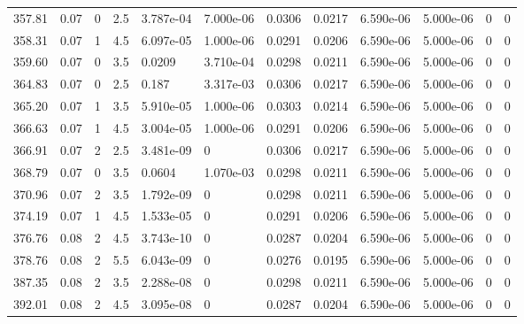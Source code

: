 \documentclass[preview]{standalone}
\begin{document}
{{{{\begin{tabular}{L{1.2cm}C{1.2cm} C{0.3cm}C{0.5cm} C{1.4cm}C{1.4cm} C{1.4cm}C{1.4cm} C{1.6cm}C{1.6cm} C{1.6cm}C{1.6cm}}
  357.81  &  0.07  & 0     & 2.5 &  3.787e-04  & 7.000e-06  &  0.0306&   0.0217& 6.590e-06 & 5.000e-06   &  0 & 0  \\ 
  358.31  &  0.07  & 1     & 4.5 &  6.097e-05  & 1.000e-06  &  0.0291&   0.0206& 6.590e-06 & 5.000e-06   &  0 & 0  \\ 
  359.60  &  0.07  & 0     & 3.5 &  0.0209  & 3.710e-04  &  0.0298&   0.0211& 6.590e-06 & 5.000e-06   &  0 & 0  \\ 
  364.83  &  0.07  & 0     & 2.5 &  0.187  & 3.317e-03  &  0.0306&   0.0217& 6.590e-06 & 5.000e-06   &  0 & 0  \\ 
  365.20  &  0.07  & 1     & 3.5 &  5.910e-05  & 1.000e-06  &  0.0303&   0.0214& 6.590e-06 & 5.000e-06   &  0 & 0  \\ 
  366.63  &  0.07  & 1     & 4.5 &  3.004e-05  & 1.000e-06  &  0.0291&   0.0206& 6.590e-06 & 5.000e-06   &  0 & 0  \\ 
  366.91  &  0.07  & 2     & 2.5 &  3.481e-09  & 0  &  0.0306&   0.0217& 6.590e-06 & 5.000e-06   &  0 & 0  \\ 
  368.79  &  0.07  & 0     & 3.5 &  0.0604  & 1.070e-03  &  0.0298&   0.0211& 6.590e-06 & 5.000e-06   &  0 & 0  \\ 
  370.96  &  0.07  & 2     & 3.5 &  1.792e-09  & 0  &  0.0298&   0.0211& 6.590e-06 & 5.000e-06   &  0 & 0  \\ 
  374.19  &  0.07  & 1     & 4.5 &  1.533e-05  & 0  &  0.0291&   0.0206& 6.590e-06 & 5.000e-06   &  0 & 0  \\ 
  376.76  &  0.08  & 2     & 4.5 &  3.743e-10  & 0  &  0.0287&   0.0204& 6.590e-06 & 5.000e-06   &  0 & 0  \\ 
  378.76  &  0.08  & 2     & 5.5 &  6.043e-09  & 0  &  0.0276&   0.0195& 6.590e-06 & 5.000e-06   &  0 & 0  \\ 
  387.35  &  0.08  & 2     & 3.5 &  2.288e-08  & 0  &  0.0298&   0.0211& 6.590e-06 & 5.000e-06   &  0 & 0  \\ 
  392.01  &  0.08  & 2     & 4.5 &  3.095e-08  & 0  &  0.0287&   0.0204& 6.590e-06 & 5.000e-06   &  0 & 0  \\ 
\hline 
\end{tabular} 

}}}}
\end{document}
